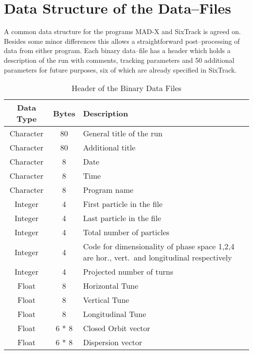 \chapter{Data Structure of the Data--Files} \label{Header}

A common data structure for the programs MAD-X and SixTrack is agreed on.
Besides some minor differences this allows a straightforward post--processing of data from either program.
Each binary data--file has a header which holds a description of the run with comments, tracking parameters and 50 additional parameters for future purposes, six of which are already specified in SixTrack.

\begin{table}[h]
    \caption{Header of the Binary Data Files}
    \label{T-HDF}
    \centering
    \begin{tabular}{|c|c|>{\raggedright\arraybackslash}p{8cm}|}
        \hline
        \rowcolor{blue!30}
        \textbf{Data Type} & \textbf{Bytes} & \textbf{Description} \\
        \hline
        Character & 80 & General title of the run \\
        \hline
        Character & 80 & Additional title \\
        \hline
        Character & 8 & Date \\
        \hline
        Character & 8 & Time \\
        \hline
        Character & 8 & Program name \\
        \hline
        Integer & 4 & First particle in the file \\
        \hline
        Integer & 4 & Last particle in the file \\
        \hline
        Integer & 4 & Total number of particles \\
        \hline
        Integer & 4 & Code for dimensionality of phase space 1,2,4 are hor., vert.\ and longitudinal respectively \\
        \hline
        Integer & 4 & Projected number of turns \\
        \hline
        Float & 8 & Horizontal Tune \\
        \hline
        Float & 8 & Vertical Tune \\
        \hline
        Float & 8 & Longitudinal Tune \\
        \hline
        Float & 6 * 8 & Closed Orbit vector \\
        \hline
        Float & 6 * 8 & Dispersion vector \\

\end{tabular}
\end{table}
